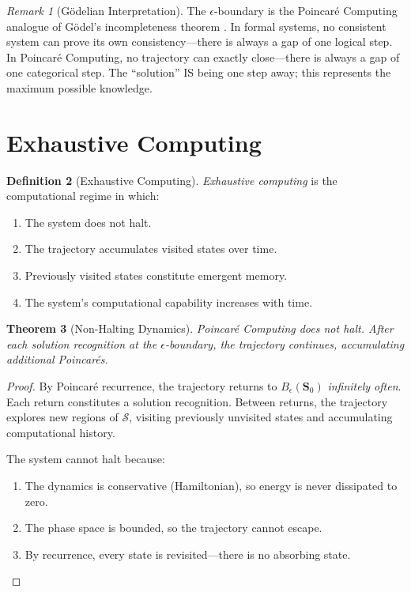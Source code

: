 \documentclass[twocolumn,10pt,a4paper]{article}
\theoremstyle{plain}
\newtheorem{theorem}{Theorem}[section]
\theoremstyle{definition}
\newtheorem{definition}[theorem]{Definition}
\theoremstyle{remark}
\newtheorem{remark}[theorem]{Remark}
\newcommand{\Sspace}{\mathcal{S}}
\newcommand{\Scoord}{\mathbf{S}}
\begin{document}
\begin{remark}[G\"{o}delian Interpretation]
The $\epsilon$-boundary is the Poincar\'{e} Computing analogue of G\"{o}del's incompleteness theorem \cite{godel1931}. In formal systems, no consistent system can prove its own consistency---there is always a gap of one logical step. In Poincar\'{e} Computing, no trajectory can exactly close---there is always a gap of one categorical step. The ``solution'' IS being one step away; this represents the maximum possible knowledge.
\end{remark}

\section{Exhaustive Computing}
\label{sec:exhaustive}

\begin{definition}[Exhaustive Computing]
\label{def:exhaustive}
\emph{Exhaustive computing} is the computational regime in which:
\begin{enumerate}
    \item The system does not halt.
    \item The trajectory accumulates visited states over time.
    \item Previously visited states constitute emergent memory.
    \item The system's computational capability increases with time.
\end{enumerate}
\end{definition}

\begin{theorem}[Non-Halting Dynamics]
\label{thm:non_halting}
Poincar\'{e} Computing does not halt. After each solution recognition at the $\epsilon$-boundary, the trajectory continues, accumulating additional Poincar\'{e}s.
\end{theorem}

\begin{proof}
By Poincar\'{e} recurrence, the trajectory returns to $B_\epsilon(\Scoord_0)$ \emph{infinitely often}. Each return constitutes a solution recognition. Between returns, the trajectory explores new regions of $\Sspace$, visiting previously unvisited states and accumulating computational history.

The system cannot halt because:
\begin{enumerate}
    \item The dynamics is conservative (Hamiltonian), so energy is never dissipated to zero.
    \item The phase space is bounded, so the trajectory cannot escape.
    \item By recurrence, every state is revisited---there is no absorbing state.
\end{enumerate}
\end{proof}
\end{document}
